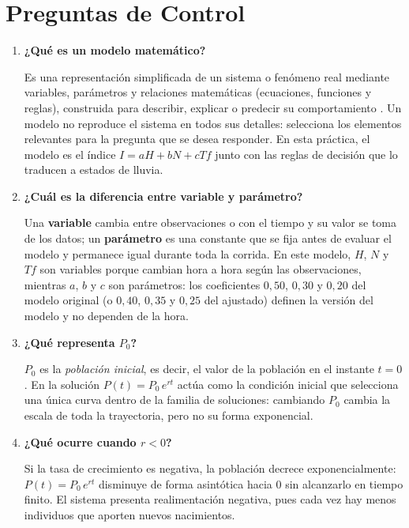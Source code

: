 \documentclass[11pt,a4paper]{article}
\begin{document}
\section{Preguntas de Control}

\begin{enumerate}[leftmargin=*]

  \item \textbf{¿Qu\'e es un modelo matem\'atico?}

  Es una representaci\'on simplificada de un sistema o fen\'omeno real mediante
  variables, par\'ametros y relaciones matem\'aticas (ecuaciones, funciones y reglas),
  construida para describir, explicar o predecir su comportamiento
  \cite{lawkelton2015,banks2010}. Un modelo no reproduce el sistema en todos sus
  detalles: selecciona los elementos relevantes para la pregunta que se desea responder.
  En esta pr\'actica, el modelo es el \'indice $I = aH + bN + cTf$ junto con las reglas
  de decisi\'on que lo traducen a estados de lluvia.

  \item \textbf{¿Cu\'al es la diferencia entre variable y par\'ametro?}

  Una \textbf{variable} cambia entre observaciones o con el tiempo y su valor se toma de
  los datos; un \textbf{par\'ametro} es una constante que se fija antes de evaluar el
  modelo y permanece igual durante toda la corrida. En este modelo, $H$, $N$ y $Tf$ son
  variables porque cambian hora a hora seg\'un las observaciones, mientras $a$, $b$ y $c$
  son par\'ametros: los coeficientes $0{,}50$, $0{,}30$ y $0{,}20$ del modelo original
  (o $0{,}40$, $0{,}35$ y $0{,}25$ del ajustado) definen la versi\'on del modelo y no
  dependen de la hora.

  \item \textbf{¿Qu\'e representa $P_0$?}

  $P_0$ es la \emph{poblaci\'on inicial}, es decir, el valor de la poblaci\'on en el
  instante $t = 0$. En la soluci\'on $P(t) = P_0\,e^{rt}$ act\'ua como la condici\'on
  inicial que selecciona una \'unica curva dentro de la familia de soluciones: cambiando
  $P_0$ cambia la escala de toda la trayectoria, pero no su forma exponencial.

  \item \textbf{¿Qu\'e ocurre cuando $r < 0$?}

  Si la tasa de crecimiento es negativa, la poblaci\'on decrece exponencialmente:
  $P(t) = P_0\,e^{rt}$ disminuye de forma asint\'otica hacia $0$ sin alcanzarlo en tiempo
  finito. El sistema presenta realimentaci\'on negativa, pues cada vez hay menos
  individuos que aporten nuevos nacimientos.


\end{enumerate}
\end{document}
